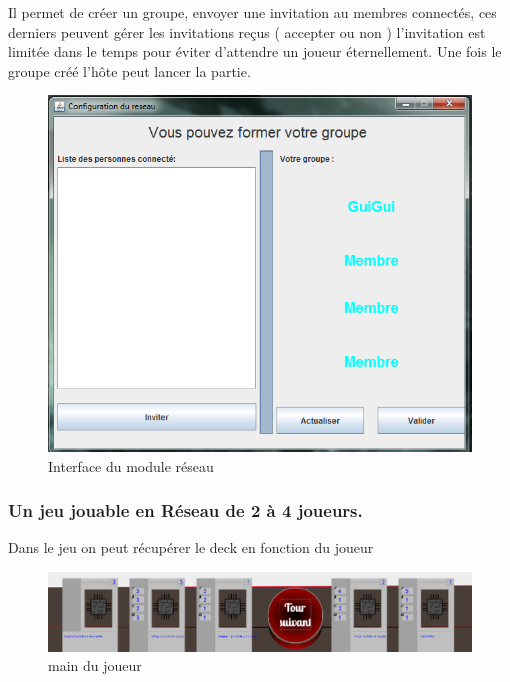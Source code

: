\documentclass[a4paper,11pt]{report}
\begin{document}
	Il permet de créer un groupe, envoyer une invitation au membres connectés, ces derniers peuvent gérer les invitations reçus ( accepter ou non ) l'invitation est limitée dans le temps pour éviter d'attendre un joueur éternellement. Une fois le groupe créé l'hôte peut lancer la partie.   
	
	 \begin{figure}[th]
	\begin{center}
	\includegraphics[scale=0.5]{Assets/connection3.png} 
	\caption{Interface du module réseau}
     \label{interface reseau}
      \end{center}
    \end{figure}

	
	\subsubsection{Un jeu jouable en Réseau de 2 à 4 joueurs.}
	
	Dans le jeu on peut récupérer le deck en fonction du joueur\\
	 \begin{figure}[th]	
	\begin{center}
	\includegraphics[scale=0.3]{Assets/mainJoueur.png} 
	\caption{main du joueur}
     \label{cartesJoueur}
      \end{center}
    \end{figure}
\end{document}

